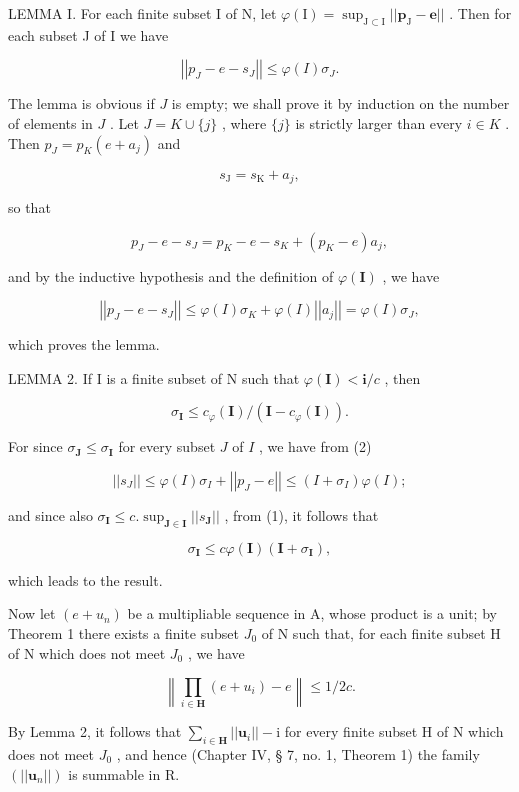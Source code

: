 LEMMA I. For each finite subset I of N, let \(\varphi(\mathrm{I}) = \sup_{\mathrm{J} \subset \mathrm{I}} ||\boldsymbol{p}_{\mathrm{J}} - \boldsymbol{e}||\) . Then for each subset J of I we have

\[
\left| \left| p _ {J} - e - s _ {J} \right| \right| \leqslant \varphi (I) \sigma_ {J}.\tag{2}
\]

The lemma is obvious if \(J\) is empty; we shall prove it by induction on the number of elements in \(J\) . Let \(J = K \cup \{j\}\) , where \(\{j\}\) is strictly larger than every \(i \in K\) . Then \(p_J = p_K(e + a_j)\) and

\[
s _ {\mathrm{J}} = s _ {\mathrm{K}} + a _ {j},
\]

so that

\[
p _ {J} - e - s _ {J} = p _ {K} - e - s _ {K} + (p _ {K} - e) a _ {j},
\]

and by the inductive hypothesis and the definition of \(\varphi(\mathbf{I})\) , we have

\[
\left| \left| p _ {J} - e - s _ {J} \right| \right| \leqslant \varphi (I) \sigma_ {K} + \varphi (I) \left| \left| a _ {j} \right| \right| = \varphi (I) \sigma_ {J},
\]

which proves the lemma.

LEMMA 2. If I is a finite subset of N such that \(\varphi(\mathbf{I}) < \mathbf{i}/c\) , then

\[
\sigma_ {\mathbf {I}} \leqslant c _ {\varphi} (\mathbf {I}) / (\mathbf {I} - c _ {\varphi} (\mathbf {I})).
\]

For since \(\sigma_{\mathbf{J}} \leqslant \sigma_{\mathbf{I}}\) for every subset \(J\) of \(I\) , we have from (2)

\[
\left| \left| s _ {J} \right| \right| \leqslant \varphi (I) \sigma_ {I} + \left| \left| p _ {J} - e \right| \right| \leqslant (I + \sigma_ {I}) \varphi (I);
\]

and since also \(\sigma_{\mathbf{I}} \leqslant c.\sup_{\mathbf{J} \in \mathbf{I}} ||s_{\mathbf{J}}||\) , from (1), it follows that

\[
\sigma_ {\mathbf {I}} \leqslant c \varphi (\mathbf {I}) (\mathbf {I} + \sigma_ {\mathbf {I}}),
\]

which leads to the result.

Now let \((e + u_{n})\) be a multipliable sequence in A, whose product is a unit; by Theorem 1 there exists a finite subset \(J_{0}\) of N such that, for each finite subset H of N which does not meet \(J_{0}\) , we have

\[
\left\| \prod_ {i \in \mathbf {H}} (e + u _ {i}) - e \right\| \leqslant 1 / 2 c.
\]

By Lemma 2, it follows that \(\sum_{i\in\mathbf{H}}||\boldsymbol{u}_{i}||-\mathrm{i}\) for every finite subset H of N which does not meet \(J_{0}\) , and hence (Chapter IV, § 7, no. 1, Theorem 1) the family \((||\boldsymbol{u}_{n}||)\) is summable in R.

